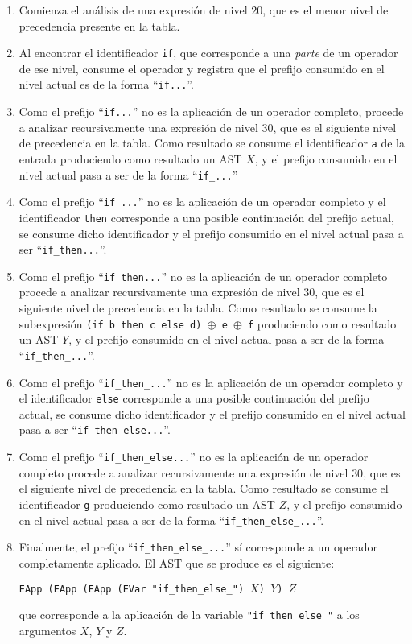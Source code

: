 \begin{enumerate}
\item Comienza el análisis de una expresión de nivel $20$,
      que es el menor nivel de precedencia presente en la tabla.
\item Al encontrar el identificador \texttt{if}, que corresponde a una {\em parte}
      de un operador de ese nivel, consume el operador
      y registra que el prefijo consumido en el nivel actual es de la forma ``\texttt{if...}''.
\item Como el prefijo ``\texttt{if...}'' no es la aplicación de un operador completo,
      procede a analizar recursivamente una expresión de nivel $30$, que es el siguiente nivel de precedencia en la tabla.
      Como resultado se consume el identificador \texttt{a} de la entrada
      produciendo como resultado un AST $X$,
      y el prefijo consumido en el nivel actual pasa a ser de la forma ``\texttt{if\_...}''
\item Como el prefijo ``\texttt{if\_...}'' no es la aplicación de un operador completo
      y el identificador \texttt{then} corresponde a una posible continuación del prefijo
      actual, se consume dicho identificador y el prefijo consumido en el nivel actual pasa a ser ``\texttt{if\_then...}''.
\item Como el prefijo ``\texttt{if\_then...}'' no es la aplicación de un operador completo
      procede a analizar recursivamente una expresión de nivel $30$, que es el siguiente nivel de precedencia en la tabla.
      Como resultado se consume la subexpresión
      \texttt{(if b then c else d) $\oplus$ e $\oplus$ f}
      produciendo como resultado un AST $Y$,
      y el prefijo consumido en el nivel actual pasa a ser de la forma ``\texttt{if\_then\_...}''.
\item Como el prefijo ``\texttt{if\_then\_...}'' no es la aplicación de un operador completo
      y el identificador \texttt{else} corresponde a una posible continuación del prefijo
      actual, se consume dicho identificador y el prefijo consumido en el nivel actual pasa a ser ``\texttt{if\_then\_else...}''.
\item Como el prefijo ``\texttt{if\_then\_else...}'' no es la aplicación de un operador completo
      procede a analizar recursivamente una expresión de nivel $30$, que es el siguiente nivel de precedencia en la tabla.
      Como resultado se consume el identificador \texttt{g}
      produciendo como resultado un AST $Z$,
      y el prefijo consumido en el nivel actual pasa a ser de la forma ``\texttt{if\_then\_else\_...}''.
\item Finalmente, el prefijo ``\texttt{if\_then\_else\_...}'' sí corresponde 
      a un operador completamente aplicado. El AST que se produce es el siguiente:
\begin{center}
\texttt{EApp (EApp (EApp (EVar \texttt{"}if\_then\_else\_\texttt{"}) $X$) $Y$) $Z$}
\end{center}
      que corresponde a la aplicación de la variable
      \texttt{\texttt{"}if\_then\_else\_\texttt{"}}
      a los argumentos $X$, $Y$ y $Z$.
\end{enumerate}
